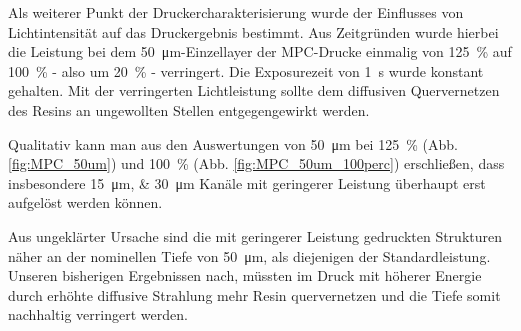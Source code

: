 Als weiterer Punkt der Druckercharakterisierung wurde der Einflusses von Lichtintensität auf das Druckergebnis bestimmt. Aus Zeitgründen wurde hierbei die Leistung bei dem \SI{50}{\micro\meter}-Einzellayer der MPC-Drucke einmalig von \SI{125}{\percent} auf \SI{100}{\percent} - also um \SI{20}{\percent} - verringert. Die Exposurezeit von \SI{1}{\second} wurde konstant gehalten. Mit der verringerten Lichtleistung sollte dem diffusiven Quervernetzen des Resins an ungewollten Stellen entgegengewirkt werden.

Qualitativ kann man aus den Auswertungen von \SI{50}{\micro\meter} bei \SI{125}{\percent} (Abb. \ref{fig:MPC_50um}) und \SI{100}{\percent} (Abb. \ref{fig:MPC_50um_100perc}) erschließen, dass insbesondere \SIlist{15;30}{\micro\meter} Kanäle mit geringerer Leistung überhaupt erst aufgelöst werden können.

Aus ungeklärter Ursache sind die mit geringerer Leistung gedruckten Strukturen näher an der nominellen Tiefe von \SI{50}{\micro\meter}, als diejenigen der Standardleistung. Unseren bisherigen Ergebnissen nach, müssten im Druck mit höherer Energie durch erhöhte diffusive Strahlung mehr Resin quervernetzen und die Tiefe somit nachhaltig verringert werden.

